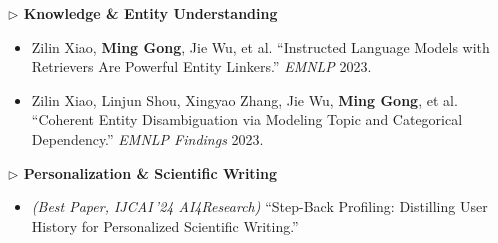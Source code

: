 \documentclass[10.5pt,letterpaper]{article}
\begin{document}
\noindent\textcolor{blue!60!black}{\textbf{$\triangleright$ Knowledge \& Entity Understanding}}
\begin{itemize}
  \item Zilin Xiao, \textbf{Ming Gong}, Jie Wu, et al. ``Instructed Language Models with Retrievers Are Powerful Entity Linkers.'' \textit{EMNLP} 2023.
  \item Zilin Xiao, Linjun Shou, Xingyao Zhang, Jie Wu, \textbf{Ming Gong}, et al. ``Coherent Entity Disambiguation via Modeling Topic and Categorical Dependency.'' \textit{EMNLP Findings} 2023.
\end{itemize}

\noindent\textcolor{blue!60!black}{\textbf{$\triangleright$ Personalization \& Scientific Writing}}
\begin{itemize}
  \item \textit{(Best Paper, IJCAI\,'24 AI4Research)} ``Step-Back Profiling: Distilling User History for Personalized Scientific Writing.''
\end{itemize}

\end{document}
